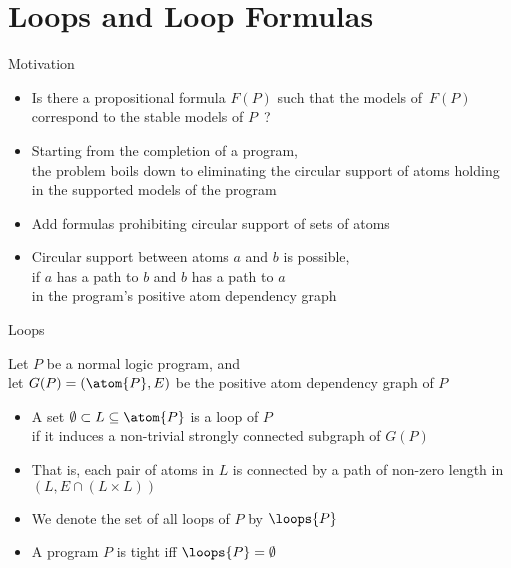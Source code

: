 \section{Loops and Loop Formulas}
\begin{frame}[c]{Motivation}
  \begin{itemize}
  \item<1-> 
    Is there a propositional formula $F(P)$ such that the models of~$F(P)$ correspond to the
    stable models of $P$~?
    \bigskip
  \item<2-> 
    Starting from the completion of a program,\\
    the problem boils down to eliminating the circular support of atoms
    holding in the supported models of the program
    \medskip
  \item<3-> 
    Add formulas prohibiting circular support of sets of atoms
  \item<4-> 
    Circular support between atoms $a$ and $b$ is possible,\\
    if $a$ has a path to $b$ and $b$ has a path to $a$\\
    in the program's positive atom dependency graph
  \end{itemize}
\end{frame}
\begin{frame}{Loops}

Let $P$ be a normal logic program, and\\
let $G(P) = (\atom{P},E)$ be the positive atom dependency graph of $P$

\begin{itemize}
\item<2-> A set $\emptyset\subset L \subseteq \atom{P}$ is a \alert{loop} of $P$\\
  if it induces a non-trivial strongly connected subgraph of $G(P)$
\item<3->[] That is, each pair of atoms in $L$ is connected by a path of non-zero length in
  $(L,E\cap(L \times L))$
  \bigskip
\item<4-> We denote the set of all loops of $P$ by $\loops{P}$
  \medskip
\item<5->  A program $P$ is tight iff $\loops{P}=\emptyset$
\end{itemize}
\end{frame}
